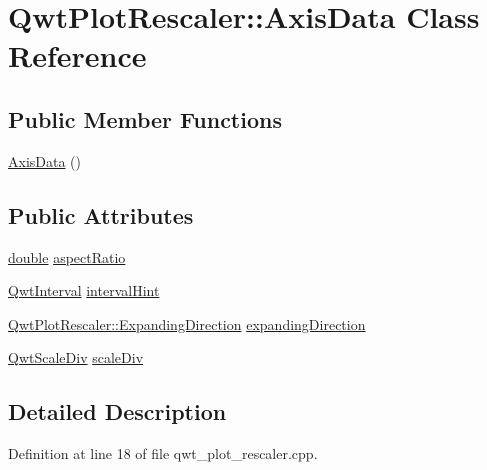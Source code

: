 \hypertarget{class_qwt_plot_rescaler_1_1_axis_data}{\section{Qwt\-Plot\-Rescaler\-:\-:Axis\-Data Class Reference}
\label{class_qwt_plot_rescaler_1_1_axis_data}
}
\subsection*{Public Member Functions}
\begin{DoxyCompactItemize}
\item 
\hyperlink{class_qwt_plot_rescaler_1_1_axis_data_ac12cc88957cb5f07432bdac991876181}{Axis\-Data} ()
\end{DoxyCompactItemize}
\subsection*{Public Attributes}
\begin{DoxyCompactItemize}
\item 
\hyperlink{_super_l_u_support_8h_a8956b2b9f49bf918deed98379d159ca7}{double} \hyperlink{class_qwt_plot_rescaler_1_1_axis_data_a076940a937f7e4f63cae682c305780ed}{aspect\-Ratio}
\item 
\hyperlink{class_qwt_interval}{Qwt\-Interval} \hyperlink{class_qwt_plot_rescaler_1_1_axis_data_a191f54710ba6489d5bd8236cef9479b9}{interval\-Hint}
\item 
\hyperlink{class_qwt_plot_rescaler_a1c314e9513cef076a79381111aa67585}{Qwt\-Plot\-Rescaler\-::\-Expanding\-Direction} \hyperlink{class_qwt_plot_rescaler_1_1_axis_data_a3dd8b83db2205c4e7b53024faad289e3}{expanding\-Direction}
\item 
\hyperlink{class_qwt_scale_div}{Qwt\-Scale\-Div} \hyperlink{class_qwt_plot_rescaler_1_1_axis_data_abba86d379087bbe8d056fcd22fc93927}{scale\-Div}
\end{DoxyCompactItemize}


\subsection{Detailed Description}


Definition at line 18 of file qwt\-\_\-plot\-\_\-rescaler.\-cpp.



